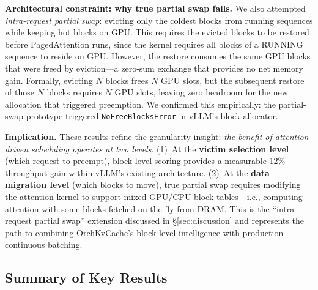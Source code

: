 \documentclass[conference]{IEEEtran}
\begin{document}
\textbf{Architectural constraint: why true partial swap fails.} We also attempted \emph{intra-request partial swap}: evicting only the coldest blocks from running sequences while keeping hot blocks on GPU. This requires the evicted blocks to be restored before PagedAttention runs, since the kernel requires all blocks of a RUNNING sequence to reside on GPU. However, the restore consumes the same GPU blocks that were freed by eviction---a zero-sum exchange that provides no net memory gain. Formally, evicting $N$ blocks frees $N$ GPU slots, but the subsequent restore of those $N$ blocks requires $N$ GPU slots, leaving zero headroom for the new allocation that triggered preemption. We confirmed this empirically: the partial-swap prototype triggered \texttt{NoFreeBlocksError} in vLLM's block allocator.

\textbf{Implication.} These results refine the granularity insight: \emph{the benefit of attention-driven scheduling operates at two levels}. (1)~At the \textbf{victim selection level} (which request to preempt), block-level scoring provides a measurable 12\% throughput gain within vLLM's existing architecture. (2)~At the \textbf{data migration level} (which blocks to move), true partial swap requires modifying the attention kernel to support mixed GPU/CPU block tables---i.e., computing attention with some blocks fetched on-the-fly from DRAM. This is the ``intra-request partial swap'' extension discussed in \S\ref{sec:discussion} and represents the path to combining OrchKvCache's block-level intelligence with production continuous batching.

\subsection{Summary of Key Results}
\end{document}
